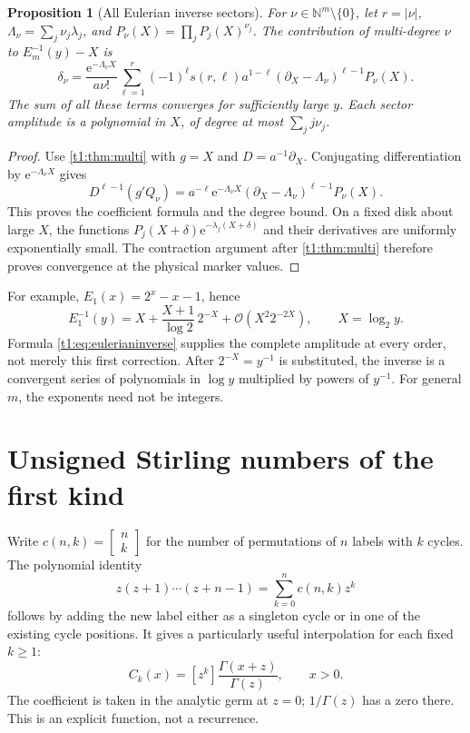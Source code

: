 \documentclass[11pt,openany]{book}
\numberwithin{equation}{chapter}
\theoremstyle{plain}
\newtheorem{proposition}[theorem]{Proposition}
\theoremstyle{definition}
\theoremstyle{remark}
\newcommand{\ee}{\mathrm e}
\newcommand{\NN}{\mathbb N}\newcommand{\RR}{\mathbb R}\newcommand{\CC}{\mathbb C}\newcommand{\QQ}{\mathbb Q}
\newcommand{\OO}{\mathcal O}\newcommand{\bigO}{\mathcal O}
\newcommand{\StirI}[2]{\left[\begin{matrix}#1\\#2\end{matrix}\right]}
\begin{document}
\begin{proposition}[All Eulerian inverse sectors]\label{t1:prop:eulerian}
For $\nu\in\NN^m\setminus\{0\}$, let $r=|\nu|$, $\Lambda_\nu=\sum_j\nu_j\lambda_j$, and $P_\nu(X)=\prod_jP_j(X)^{\nu_j}$. The contribution of multi-degree $\nu$ to $E_m^{-1}(y)-X$ is
\begin{equation}
 \delta_\nu=
 \frac{\ee^{-\Lambda_\nu X}}{a\nu!}
 \sum_{\ell=1}^r(-1)^\ell s(r,\ell)a^{1-\ell}
 (\partial_X-\Lambda_\nu)^{\ell-1}P_\nu(X).
 \label{t1:eq:eulerianinverse}
\end{equation}
The sum of all these terms converges for sufficiently large $y$. Each sector amplitude is a polynomial in $X$, of degree at most $\sum_jj\nu_j$.
\end{proposition}
\begin{proof}
Use \cref{t1:thm:multi} with $g=X$ and $D=a^{-1}\partial_X$. Conjugating differentiation by $\ee^{-\Lambda_\nu X}$ gives
\[
 D^{\ell-1}(g'Q_\nu)=a^{-\ell}\ee^{-\Lambda_\nu X}
 (\partial_X-\Lambda_\nu)^{\ell-1}P_\nu(X).
\]
This proves the coefficient formula and the degree bound. On a fixed disk about large $X$, the functions $P_j(X+\delta)\ee^{-\lambda_j(X+\delta)}$ and their derivatives are uniformly exponentially small. The contraction argument after \cref{t1:thm:multi} therefore proves convergence at the physical marker values.
\end{proof}

For example, $E_1(x)=2^x-x-1$, hence
\[
 E_1^{-1}(y)=X+\frac{X+1}{\log2}\,2^{-X}
 +\OO(X^2 2^{-2X}),\qquad X=\log_2 y.
\]
Formula \eqref{t1:eq:eulerianinverse} supplies the complete amplitude at every order, not merely this first correction. After $2^{-X}=y^{-1}$ is substituted, the inverse is a convergent series of polynomials in $\log y$ multiplied by powers of $y^{-1}$. For general $m$, the exponents need not be integers.
\section{Unsigned Stirling numbers of the first kind}

Write $c(n,k)=\StirI nk$ for the number of permutations of $n$ labels with $k$ cycles. The polynomial identity
\[
 z(z+1)\cdots(z+n-1)=\sum_{k=0}^n c(n,k)z^k
\]
follows by adding the new label either as a singleton cycle or in one of the existing cycle positions. It gives a particularly useful interpolation for each fixed $k\ge1$:
\begin{equation}
 C_k(x)=[z^k]\frac{\Gamma(x+z)}{\Gamma(z)},\qquad x>0.
 \label{t2:eq:stirling1-cont}
\end{equation}
The coefficient is taken in the analytic germ at $z=0$; $1/\Gamma(z)$ has a zero there. This is an explicit function, not a recurrence.
\end{document}
